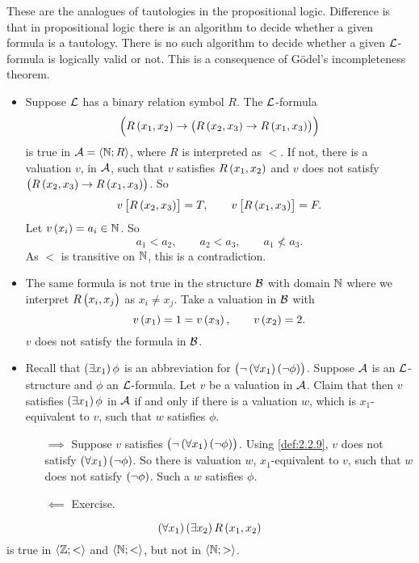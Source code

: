 These are the analogues of tautologies in the propositional logic. Difference is that in propositional logic there is an algorithm to decide whether a given formula is a tautology. There is no such algorithm to decide whether a given $ \LL $-formula is logically valid or not. This is a consequence of G\"odel's incompleteness theorem.

\begin{example}
\hfill
\begin{itemize}
\item Suppose $ \LL $ has a binary relation symbol $ R $. The $ \LL $-formula
$$ \impb{R\br{x_1, x_2}}{\impb{R\br{x_2, x_3}}{R\br{x_1, x_3}}} $$
is true in $ \AA = \abr{\N; R} $, where $ R $ is interpreted as $ < $. If not, there is a valuation $ v $, in $ \AA $, such that $ v $ satisfies $ R\br{x_1, x_2} $ and $ v $ does not satisfy $ \impb{R\br{x_2, x_3}}{R\br{x_1, x_3}} $. So
$$ v\sbr{R\br{x_2, x_3}} = T, \qquad v\sbr{R\br{x_1, x_3}} = F. $$
Let $ v\br{x_i} = a_i \in \N $. So
$$ a_1 < a_2, \qquad a_2 < a_3, \qquad a_1 \not< a_3. $$
As $ < $ is transitive on $ \N $, this is a contradiction.
\item The same formula is not true in the structure $ \BB $ with domain $ \N $ where we interpret $ R\br{x_i, x_j} $ as $ x_i \ne x_j $. Take a valuation in $ \BB $ with
$$ v\br{x_1} = 1 = v\br{x_3}, \qquad v\br{x_2} = 2. $$
$ v $ does not satisfy the formula in $ \BB $.
\item Recall that $ \teb{x_1}\phi $ is an abbreviation for $ \notb{\fab{x_1}\notb{\phi}} $. Suppose $ \AA $ is an $ \LL $-structure and $ \phi $ an $ \LL $-formula. Let $ v $ be a valuation in $ \AA $. Claim that then $ v $ satisfies $ \teb{x_1}\phi $ in $ \AA $ if and only if there is a valuation $ w $, which is $ x_1 $-equivalent to $ v $, such that $ w $ satisfies $ \phi $.
\begin{itemize}
\item[$ \implies $] Suppose $ v $ satisfies $ \notb{\fab{x_1}\notb{\phi}} $. Using \ref{def:2.2.9}, $ v $ does not satisfy $ \fab{x_1}\notb{\phi} $. So there is valuation $ w $, $ x_1 $-equivalent to $ v $, such that $ w $ does not satisfy $ \notb{\phi} $. Such a $ w $ satisfies $ \phi $.
\item[$ \impliedby $] Exercise.
\end{itemize}
\end{itemize}
\end{example}

\begin{example}
$$ \fab{x_1}\teb{x_2}R\br{x_1, x_2} $$
is true in $ \abr{\Z; <} $ and $ \abr{\N; <} $, but not in $ \abr{\N; >} $.
\end{example}

